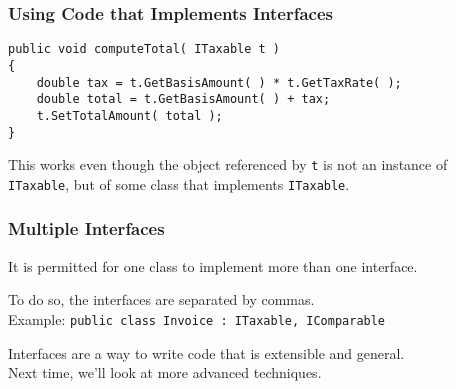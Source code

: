 \begin{frame}[fragile]
\frametitle{Using Code that Implements Interfaces}

\begin{verbatim}
public void computeTotal( ITaxable t )
{
    double tax = t.GetBasisAmount( ) * t.GetTaxRate( );
    double total = t.GetBasisAmount( ) + tax;
    t.SetTotalAmount( total );
}
\end{verbatim}

This works even though the object referenced by \texttt{t} is not an instance of \texttt{ITaxable}, but of some class that implements \texttt{ITaxable}.

\end{frame}

\begin{frame}
\frametitle{Multiple Interfaces}
It is permitted for one class to implement more than one interface.

To do so, the interfaces are separated by commas.\\
\quad Example: \texttt{public class Invoice : ITaxable, IComparable}

Interfaces are a way to write code that is extensible and general.\\
\quad Next time, we'll look at more advanced techniques.

\end{frame}




